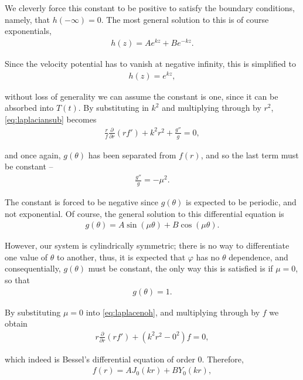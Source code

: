 \documentclass[12pt]{article}
\begin{document}
We cleverly force this constant to be positive to satisfy the boundary conditions, namely, that $h(-\infty) = 0$. The most general solution to this is of course exponentials,
\begin{align*}
h(z) = Ae^{kz} + Be^{-kz}.
\end{align*}

Since the velocity potential has to vanish at negative infinity, this is simplified to
\begin{align}
\label{eq:h}
h(z) = e^{kz},
\end{align}

without loss of generality we can assume the constant is one, since it can be absorbed into $T(t)$. By substituting in $k^2$ and multiplying through by $r^2$, \eqref{eq:laplaciansub} becomes
\begin{align}
\label{eq:laplacenoh}
\frac{r}{f}\frac{\partial}{\partial r} \left( rf' \right) + k^2r^2 + \frac{g''}{g} = 0,
\end{align}

and once again, $g(\theta)$ has been separated from $f(r)$, and so the last term must be constant --
\begin{align*}
\frac{g''}{g} = -\mu^2.
\end{align*}

The constant is forced to be negative since $g(\theta)$ is expected to be periodic, and not exponential. Of course, the general solution to this differential equation is 
\begin{align*}
g(\theta) = A \sin(\mu \theta) + B \cos(\mu \theta).
\end{align*}

However, our system is cylindrically symmetric; there is no way to differentiate one value of $\theta$ to another, thus, it is expected that $\varphi$ has no $\theta$ dependence, and consequentially, $g(\theta)$ must be constant, the only way this is satisfied is if $\mu = 0$, so that
\begin{align}
\label{eq:g}
g(\theta) = 1.
\end{align}

By substituting $\mu = 0$ into \eqref{eq:laplacenoh}, and multiplying through by $f$ we obtain
\begin{align*}
r \frac{\partial}{\partial r}(rf') + (k^2r^2 - 0^2)f = 0,
\end{align*}

which indeed is Bessel's differential equation of order $0$. Therefore,
\begin{align*}
f(r) = A J_0(kr) + B Y_0(kr),
\end{align*}
\end{document}
